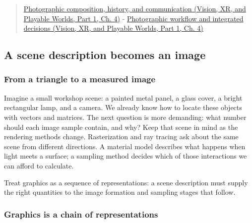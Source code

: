 \begin{quote}
\href{../07-Vision-XR-and-Playable-Worlds-P01/main.pdf\#nameddest=04-visual-computing-ii-ch034-photographic-composition-history-and-communication}{Photographic composition, history, and communication (Vision, XR, and Playable Worlds, Part 1, Ch. 4)} - \href{../07-Vision-XR-and-Playable-Worlds-P01/main.pdf\#nameddest=04-visual-computing-ii-ch034-photographic-workflow-and-integrated-decisions}{Photographic workflow and integrated decisions (Vision, XR, and Playable Worlds, Part 1, Ch. 4)}
\end{quote}

\subsection{A scene description becomes an image}\label{03-visual-computing-i-ch001-a-scene-description-becomes-an-image}

\hypertarget{03-visual-computing-i-ch001-a-scene-description-becomes-an-image}{}

\subsubsection{From a triangle to a measured image}\label{03-visual-computing-i-ch001-from-a-triangle-to-a-measured-image}

\hypertarget{03-visual-computing-i-ch001-from-a-triangle-to-a-measured-image}{}

Imagine a small workshop scene: a painted metal panel, a glass cover, a bright rectangular lamp, and a camera. We already know how to locate these objects with vectors and matrices. The next question is more demanding: what number should each image sample contain, and why? Keep that scene in mind as the rendering methods change. Rasterization and ray tracing ask about the same scene from different directions. A material model describes what happens when light meets a surface; a sampling method decides which of those interactions we can afford to calculate.

Treat graphics as a sequence of representations: a scene description must supply the right quantities to the image formation and sampling stages that follow.

\subsubsection{Graphics is a chain of representations}\label{03-visual-computing-i-ch001-graphics-is-a-chain-of-representations}

